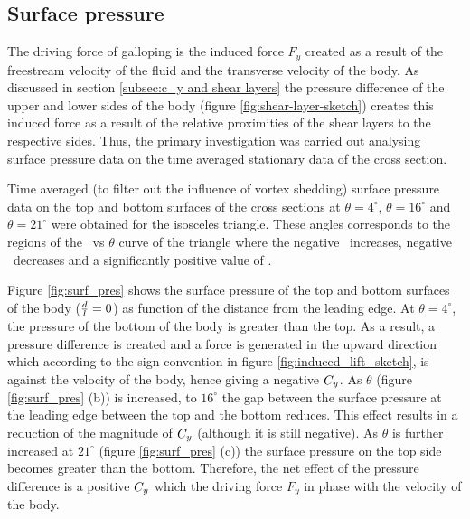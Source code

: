 \subsection{Surface pressure}
\label{subsec:cross-sec-surface pressure}

The driving force of galloping is the induced force $F_y$ created as a result of the freestream velocity of the fluid and the transverse velocity of the body. As discussed in section \ref{subsec:c_y and shear layers} the pressure difference of the upper and lower sides of the body (figure \ref{fig:shear-layer-sketch}) creates this induced force as a result of the relative proximities of the shear layers to the respective sides. Thus, the primary investigation was carried out analysing surface pressure data on the time averaged stationary data of the cross section. 


Time averaged (to filter out the influence of vortex shedding) surface pressure data  on the top and bottom surfaces of the cross sections at $\theta=4^{\circ}$, $\theta=16^{\circ}$ and $\theta=21^{\circ}$ were obtained for the isosceles triangle. These angles corresponds to the regions of the \cy\ vs $\theta$ curve of the triangle where the negative \cy\ increases, negative \cy\ decreases and a significantly positive value of \cy.   


 
 


 Figure \ref{fig:surf_pres} shows the surface pressure of the top and bottom surfaces of the body ($\frac{d}{l}=0$) as function of the distance from the leading edge. At $\theta=4^{\circ}$, the pressure of the bottom of the body is greater than the top. As a result, a pressure difference is created and a force is generated in the upward direction which according to the sign convention in figure \ref{fig:induced_lift_sketch}, is against the velocity of the body, hence giving a negative $C_{y}$. As $\theta$ (figure \ref{fig:surf_pres} (b)) is increased, to $16^{\circ}$ the gap between the surface pressure at the leading edge between the top and the bottom reduces. This effect results in a reduction of the magnitude of $C_{y}$ (although it is still negative). As $\theta$ is further increased at $21^{\circ}$ (figure \ref{fig:surf_pres} (c)) the surface pressure on the top side becomes greater than the bottom. Therefore, the net effect of the pressure difference is a positive $C_{y}$ which the driving force $F_y$ in phase with the velocity of the body.

